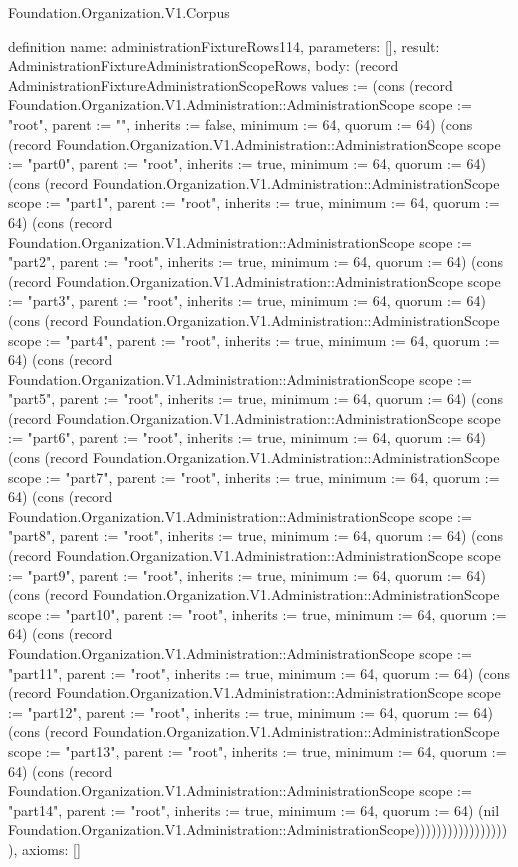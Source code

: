 \begin{lexlean}{Foundation.Organization.V1.Corpus}
\begin{semanticmodule}
definition{
  name: administrationFixtureRows114,
  parameters: [],
  result: AdministrationFixtureAdministrationScopeRows,
  body: (record AdministrationFixtureAdministrationScopeRows {values := (cons (record Foundation.Organization.V1.Administration::AdministrationScope {scope := "root", parent := "", inherits := false, minimum := 64, quorum := 64}) (cons (record Foundation.Organization.V1.Administration::AdministrationScope {scope := "part0", parent := "root", inherits := true, minimum := 64, quorum := 64}) (cons (record Foundation.Organization.V1.Administration::AdministrationScope {scope := "part1", parent := "root", inherits := true, minimum := 64, quorum := 64}) (cons (record Foundation.Organization.V1.Administration::AdministrationScope {scope := "part2", parent := "root", inherits := true, minimum := 64, quorum := 64}) (cons (record Foundation.Organization.V1.Administration::AdministrationScope {scope := "part3", parent := "root", inherits := true, minimum := 64, quorum := 64}) (cons (record Foundation.Organization.V1.Administration::AdministrationScope {scope := "part4", parent := "root", inherits := true, minimum := 64, quorum := 64}) (cons (record Foundation.Organization.V1.Administration::AdministrationScope {scope := "part5", parent := "root", inherits := true, minimum := 64, quorum := 64}) (cons (record Foundation.Organization.V1.Administration::AdministrationScope {scope := "part6", parent := "root", inherits := true, minimum := 64, quorum := 64}) (cons (record Foundation.Organization.V1.Administration::AdministrationScope {scope := "part7", parent := "root", inherits := true, minimum := 64, quorum := 64}) (cons (record Foundation.Organization.V1.Administration::AdministrationScope {scope := "part8", parent := "root", inherits := true, minimum := 64, quorum := 64}) (cons (record Foundation.Organization.V1.Administration::AdministrationScope {scope := "part9", parent := "root", inherits := true, minimum := 64, quorum := 64}) (cons (record Foundation.Organization.V1.Administration::AdministrationScope {scope := "part10", parent := "root", inherits := true, minimum := 64, quorum := 64}) (cons (record Foundation.Organization.V1.Administration::AdministrationScope {scope := "part11", parent := "root", inherits := true, minimum := 64, quorum := 64}) (cons (record Foundation.Organization.V1.Administration::AdministrationScope {scope := "part12", parent := "root", inherits := true, minimum := 64, quorum := 64}) (cons (record Foundation.Organization.V1.Administration::AdministrationScope {scope := "part13", parent := "root", inherits := true, minimum := 64, quorum := 64}) (cons (record Foundation.Organization.V1.Administration::AdministrationScope {scope := "part14", parent := "root", inherits := true, minimum := 64, quorum := 64}) (nil Foundation.Organization.V1.Administration::AdministrationScope)))))))))))))))))}),
  axioms: []
}


\end{semanticmodule}
\end{lexlean}
